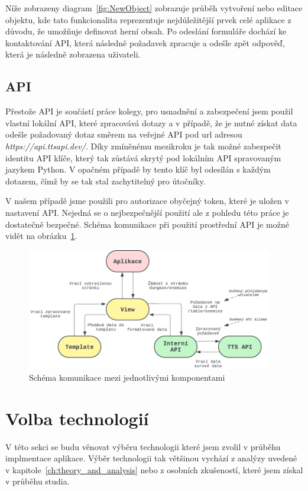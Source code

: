 Níže zobrazeny diagram~\ref{fig:NewObject} zobrazuje průběh vytvoření nebo editace objektu, kde tato funkcionalita reprezentuje nejdůležitější prvek celé aplikace z důvodu, že umožňuje definovat herní obsah. Po odeslání formuláře dochází ke kontaktování API, která následně požadavek zpracuje a odešle zpět odpověď, která je následně zobrazena uživateli.


\subsection{API}
\label{subsec:implementation-api}
Přestože API je součástí práce kolegy, pro usnadnění a zabezpečení jsem použil vlastní lokální API, které zpracovává dotazy a v případě, že je nutné získat data odešle požadovaný dotaz směrem na veřejné API pod url adresou \textit{https://api.ttsapi.dev/}. Díky zmíněnému mezikroku je tak možné zabezpečit identitu API klíče, který tak zůstává skrytý pod lokálním API spravovaným jazykem Python. V opačném případě by tento klíč byl odesílán s každým dotazem, čímž by se tak stal zachytitelný pro útočníky.

V našem případě jsme použili pro autorizace obyčejný token, které je uložen v nastavení API. Nejedná se o nejbezpečnější použití ale z pohledu této práce je dostatečně bezpečné. Schéma komunikace při použití prostřední API je možné vidět na obrázku~\ref{fig:api_communication}.

\begin{figure}[H]
    \centering
    \includegraphics[width=0.96\textwidth]{diagrams/API_Communication}
    \caption{Schéma komunikace mezi jednotlivými komponentami}
    \label{fig:api_communication}
\end{figure}

\section{Volba technologií}
\label{sec:implementation-technologies}
V této sekci se budu věnovat výběru technologii které jsem zvolil v průběhu implmentace aplikace. Výběr technologii tak většinou vychází z analýzy uvedené v kapitole~\ref{ch:theory_and_analysis} nebo z osobních zkušeností, které jsem získal v průběhu studia.

